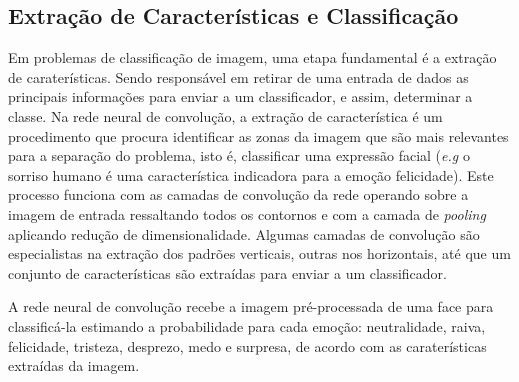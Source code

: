 \subsection{Extração de Características e Classificação}
Em problemas de classificação de imagem, uma etapa fundamental é a extração de caraterísticas. Sendo responsável em retirar de uma entrada de dados as principais informações para enviar a um classificador, e assim, determinar a classe. Na rede neural de convolução, a extração de característica é um procedimento que procura identificar as zonas da imagem que são mais relevantes para a separação do problema, isto é, classificar uma expressão facial (\textit{e.g} o sorriso humano é uma característica indicadora para a emoção felicidade). Este processo funciona com as camadas de convolução da rede operando sobre a imagem de entrada ressaltando todos os contornos e com a camada de \textit{pooling} aplicando redução de dimensionalidade. Algumas camadas de convolução são especialistas na extração dos padrões verticais, outras nos horizontais, até que um conjunto de características são extraídas para enviar a um classificador.

A rede neural de convolução recebe a imagem pré-processada de uma face para classificá-la estimando a probabilidade para cada emoção: neutralidade, raiva, felicidade, tristeza, desprezo, medo e surpresa, de acordo com as caraterísticas extraídas da imagem.  


